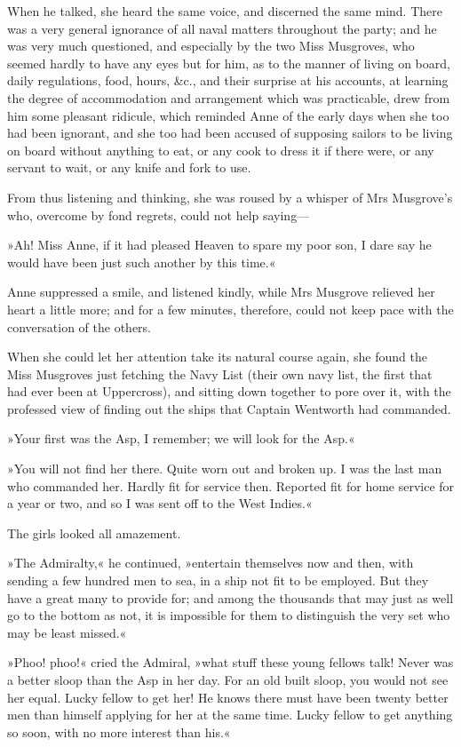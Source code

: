 When he talked, she heard the same voice, and discerned the same mind. There was a very general ignorance of all naval matters throughout the party; and he was very much questioned, and especially by the two Miss Musgroves, who seemed hardly to have any eyes but for him, as to the manner of living on board, daily regulations, food, hours, \&c., and their surprise at his accounts, at learning the degree of accommodation and arrangement which was practicable, drew from him some pleasant ridicule, which reminded Anne of the early days when she too had been ignorant, and she too had been accused of supposing sailors to be living on board without anything to eat, or any cook to dress it if there were, or any servant to wait, or any knife and fork to use.

From thus listening and thinking, she was roused by a whisper of Mrs Musgrove's who, overcome by fond regrets, could not help saying—

»Ah! Miss Anne, if it had pleased Heaven to spare my poor son, I dare say he would have been just such another by this time.«

Anne suppressed a smile, and listened kindly, while Mrs Musgrove relieved her heart a little more; and for a few minutes, therefore, could not keep pace with the conversation of the others.

When she could let her attention take its natural course again, she found the Miss Musgroves just fetching the Navy List (their own navy list, the first that had ever been at Uppercross), and sitting down together to pore over it, with the professed view of finding out the ships that Captain Wentworth had commanded.

»Your first was the Asp, I remember; we will look for the Asp.«

»You will not find her there. Quite worn out and broken up. I was the last man who commanded her. Hardly fit for service then. Reported fit for home service for a year or two, and so I was sent off to the West Indies.«

The girls looked all amazement.

»The Admiralty,« he continued, »entertain themselves now and then, with sending a few hundred men to sea, in a ship not fit to be employed. But they have a great many to provide for; and among the thousands that may just as well go to the bottom as not, it is impossible for them to distinguish the very set who may be least missed.«

»Phoo! phoo!« cried the Admiral, »what stuff these young fellows talk! Never was a better sloop than the Asp in her day. For an old built sloop, you would not see her equal. Lucky fellow to get her! He knows there must have been twenty better men than himself applying for her at the same time. Lucky fellow to get anything so soon, with no more interest than his.«

